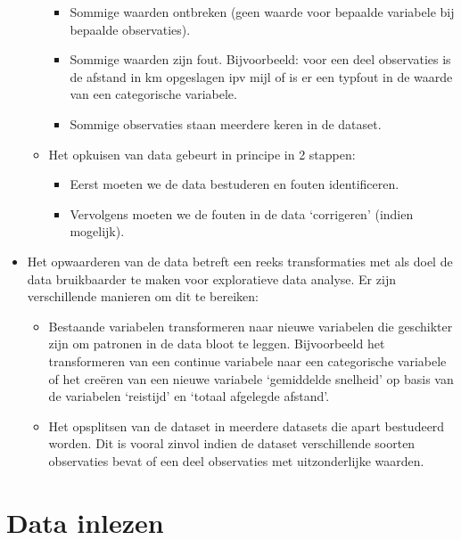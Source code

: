 \documentclass[]{tufte-book}
\providecommand{\tightlist}{%
  \setlength{\itemsep}{0pt}\setlength{\parskip}{0pt}}
\begin{document}
\begin{itemize}
\begin{itemize}
    \begin{itemize}
    \tightlist
    \item
      Sommige waarden ontbreken (geen waarde voor bepaalde variabele bij bepaalde observaties).
    \item
      Sommige waarden zijn fout. Bijvoorbeeld: voor een deel observaties is de afstand in km opgeslagen ipv mijl of is er een typfout in de waarde van een categorische variabele.
    \item
      Sommige observaties staan meerdere keren in de dataset.
    \end{itemize}
  \item
    Het opkuisen van data gebeurt in principe in 2 stappen:

    \begin{itemize}
    \tightlist
    \item
      Eerst moeten we de data bestuderen en fouten identificeren.
    \item
      Vervolgens moeten we de fouten in de data `corrigeren' (indien mogelijk).
    \end{itemize}
  \end{itemize}
\item
  Het opwaarderen van de data betreft een reeks transformaties met als doel de data bruikbaarder te maken voor exploratieve data analyse. Er zijn verschillende manieren om dit te bereiken:

  \begin{itemize}
  \tightlist
  \item
    Bestaande variabelen transformeren naar nieuwe variabelen die geschikter zijn om patronen in de data bloot te leggen. Bijvoorbeeld het transformeren van een continue variabele naar een categorische variabele of het creëren van een nieuwe variabele `gemiddelde snelheid' op basis van de variabelen `reistijd' en `totaal afgelegde afstand'.
  \item
    Het opsplitsen van de dataset in meerdere datasets die apart bestudeerd worden. Dit is vooral zinvol indien de dataset verschillende soorten observaties bevat of een deel observaties met uitzonderlijke waarden.
  \end{itemize}
\end{itemize}

\hypertarget{data-inlezen}{%
\section{Data inlezen}\label{data-inlezen}}
\end{document}
